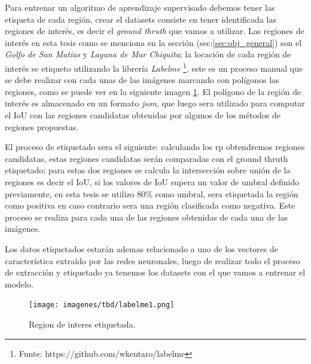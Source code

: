 Para entrenar un algoritmo de aprendizaje supervisado debemos tener las etiqueta de cada región, crear el datasets consiste en tener identificada las regiones de interés, es decir el \textit{ground thruth} que vamos a utilizar. Las regiones de interés en esta tesis como se menciona en la sección (sec:\ref{sec:obj_general}) son el \textit{Golfo de San Matias} y  \textit{Laguna de Mar Chiquita}; la locación de cada región de interés se etiqueto utilizando la librería \textit{Labelme} \footnote{Funte: https://github.com/wkentaro/labelme}, este es un proceso manual que se debe realizar con cada unas de las imágenes marcando con polígonos las regiones, como se puede ver en la siguiente imagen \ref{Fig:labelme-etiquetado}. El polígono de la región de interés es almacenado en un formato \textit{json}, que luego sera utilizado para computar el IoU con las regiones candidatas obtenidas por algunos de los métodos de regiones propuestas. 

El proceso de etiquetado sera el siguiente: calculando los \ac{rp} obtendremos regiones candidatas, estas regiones candidatas serán comparadas con el ground thruth etiquetado; para estas dos regiones se calcula la intersección sobre unión de la regiones es decir el IoU, si los valores de IoU supera un valor de umbral definido previamente, en esta tesis se utilizo $80\%$ como umbral, sera etiquetada la región como positiva en caso contrario sera una región clasificada como negativa. Este proceso se realiza para cada una de las regiones obtenidas de cada una de las imágenes. 


Los datos etiquetados estarán ademas relacionado a uno de los vectores de característica extraído por las redes neuronales, luego de realizar todo el proceso de extracción y etiquetado ya tenemos los datasets con el que vamos a entrenar el modelo.



\begin{figure}[H] \centering
  \texttt{[image: imagenes/tbd/labelme1.png]}
  \caption{Region de interes etiquetada.}\label{Fig:labelme-etiquetado}
\end{figure}


